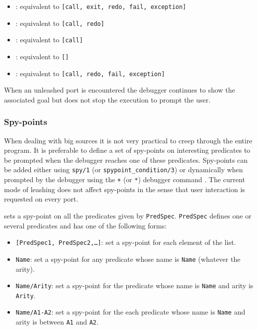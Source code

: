 \begin{itemize}

\item {}: equivalent to \texttt{[call, exit, redo, fail,
exception]}

\item {}: equivalent to \texttt{[call, redo]}

\item {}: equivalent to \texttt{[call]}

\item {}: equivalent to \texttt{[]}

\item {}: equivalent to \texttt{[call, redo, fail,
exception]}

\end{itemize}

When an unleashed port is encountered the debugger continues to show the
associated goal but does not stop the execution to prompt the user. 

\subsubsection{Spy-points}
\label{Spy-points}
When dealing with big sources it is not very practical to creep through the
entire program. It is preferable to define a set of spy-points on
interesting predicates to be prompted when the debugger reaches one of these
predicates. Spy-points can be added either using \texttt{spy/1} (or
\texttt{spypoint\_condition/3}) or dynamically when prompted by the debugger
using the \texttt{+} (or \texttt{*}) debugger command
. The current mode of leashing does not
affect spy-points in the sense that user interaction is requested on
every port.

 sets a spy-point on all the predicates given by
\texttt{PredSpec}. \texttt{PredSpec} defines one or several predicates and
has one of the following forms:

\begin{itemize}

\item \texttt{[PredSpec1, PredSpec2,\ldots]}: set a spy-point for each
element of the list.

\item \texttt{Name}: set a spy-point for any predicate whose name is
\texttt{Name} (whatever the arity).

\item \texttt{Name/Arity}: set a spy-point for the predicate whose name is
\texttt{Name} and arity is \texttt{Arity}.

\item \texttt{Name/A1-A2}: set a spy-point for the each predicate whose name
is \texttt{Name} and arity is between \texttt{A1} and \texttt{A2}.

\end{itemize}

